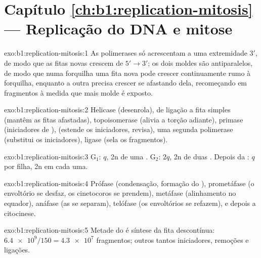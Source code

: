 \section*{Capítulo \ref{ch:b1:replication-mitosis} --- Replicação do DNA e mitose}

\begin{solution}{exo:b1:replication-mitosis:1}
As polimerases só acrescentam  a uma extremidade $3'$, de
modo que as fitas novas crescem de $5' \to 3'$; os dois moldes são
antiparalelos, de modo que numa forquilha uma fita nova pode crescer
continuamente rumo à forquilha, enquanto a outra precisa crescer se
afastando dela, recomeçando em fragmentos à medida que mais molde é
exposto.
\end{solution}

\begin{solution}{exo:b1:replication-mitosis:2}
Helicase (desenrola),  de ligação a fita simples (mantêm as
fitas afastadas), topoisomerase (alivia a torção adiante), primase
(iniciadores de ),  (estende os iniciadores, revisa),
uma segunda polimerase (substitui os iniciadores), ligase (sela os
fragmentos).
\end{solution}

\begin{solution}{exo:b1:replication-mitosis:3}
G$_1$: $q$, 2n  de uma . G$_2$: $2q$, 2n
 de duas . Depois da : $q$ por filha, 2n
 em cada uma.
\end{solution}

\begin{solution}{exo:b1:replication-mitosis:4}
Prófase (condensação, formação do ), prometáfase (o envoltório se
desfaz, os cinetocoros se prendem), metáfase (alinhamento no equador),
anáfase (as  se separam), telófase (os envoltórios se
refazem), e depois a citocinese.
\end{solution}

\begin{solution}{exo:b1:replication-mitosis:5}
Metade do  é síntese da fita descontínua: $\num{6.4e9}/150 =
\num{4.3e7}$ fragmentos; outros tantos iniciadores, remoções e ligações.
\end{solution}

